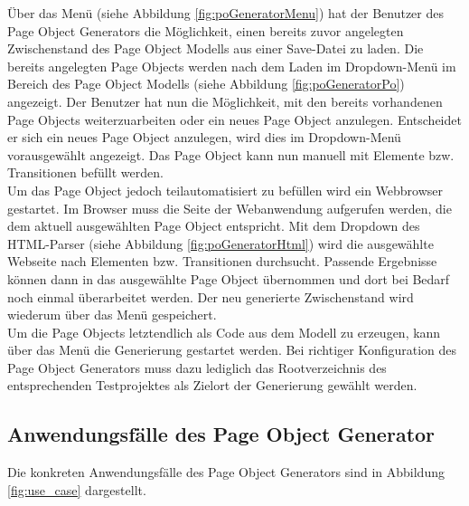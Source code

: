 Über das Menü (siehe Abbildung \ref{fig:poGeneratorMenu}) hat der Benutzer des Page Object Generators die Möglichkeit, einen bereits zuvor angelegten Zwischenstand des Page Object Modells aus einer Save-Datei zu laden. Die bereits angelegten Page Objects werden nach dem Laden im Dropdown-Menü im Bereich des Page Object Modells (siehe Abbildung \ref{fig:poGeneratorPo}) angezeigt. Der Benutzer hat nun die Möglichkeit, mit den bereits vorhandenen Page Objects weiterzuarbeiten oder ein neues Page Object anzulegen. Entscheidet er sich ein neues Page Object anzulegen, wird dies im Dropdown-Menü vorausgewählt angezeigt. Das Page Object kann nun manuell mit Elemente bzw. Transitionen befüllt werden.\\ Um das Page Object jedoch teilautomatisiert zu befüllen wird ein Webbrowser gestartet. Im Browser muss die Seite der Webanwendung aufgerufen werden, die dem aktuell ausgewählten Page Object entspricht. Mit dem Dropdown des HTML-Parser (siehe Abbildung \ref{fig:poGeneratorHtml}) wird die ausgewählte Webseite nach Elementen bzw. Transitionen durchsucht.
Passende Ergebnisse können dann in das ausgewählte Page Object übernommen und dort bei Bedarf noch einmal überarbeitet werden.
Der neu generierte Zwischenstand wird wiederum über das Menü gespeichert.\\
Um die Page Objects letztendlich als Code aus dem Modell zu erzeugen, kann über das Menü die Generierung gestartet werden. Bei richtiger Konfiguration des Page Object Generators muss dazu lediglich das Rootverzeichnis des entsprechenden Testprojektes als Zielort der Generierung gewählt werden.


\subsection{Anwendungsfälle des Page Object Generator}
\label{sec:page_object_generator_usecases}

Die konkreten Anwendungsfälle des Page Object Generators sind in Abbildung \ref{fig:use_case} dargestellt.

